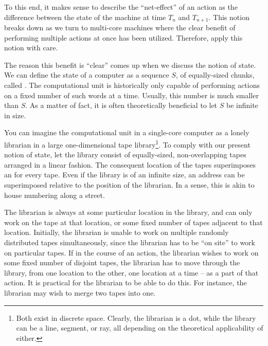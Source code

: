 To this end, it makes sense to describe the ``net-effect'' of an action as the
difference between the state of the machine at time $T_n$ and $T_{n+1}$. This
notion breaks down as we turn to multi-core machines where the clear benefit of
performing multiple actions at once has been utilized. Therefore, apply this
notion with care.

The reason this benefit is ``clear'' comes up when we discuss the notion of
state. We can define the state of a computer as a sequence $S$, of
equally-sized chunks, called . The computational unit is historically
only capable of performing actions on a fixed number of such words at a time.
Usually, this number is much smaller than $S$. As a matter of fact, it is often
theoretically beneficial to let $S$ be infinite in size.

You can imagine the computational unit in a single-core computer as a lonely
librarian in a large one-dimensional tape library\footnote{Both exist in
discrete space. Clearly, the librarian is a dot, while the library can be a
line, segment, or ray, all depending on the theoretical applicability of
either.}. To comply with our present notion of state, let the library consist
of equally-sized, non-overlapping tapes arranged in a linear fashion. The
consequent location of the tapes superimposes an  for every tape.
Even if the library is of an infinite size, an address can be superimposed
relative to the position of the librarian. In a sense, this is akin to house
numbering along a street.

The librarian is always at some particular location in the library, and can
only work on the tape at that location, or some fixed number of tapes adjacent
to that location. Initially, the librarian is unable to work on multiple
randomly distributed tapes simultaneously, since the librarian has to be ``on
site'' to work on particular tapes. If in the course of an action, the
librarian wishes to work on some fixed number of disjoint tapes, the librarian
has to move through the library, from one location to the other, one location
at a time -- as a part of that action. It is practical for the librarian to be
able to do this. For instance, the librarian may wish to merge two tapes into
one.


